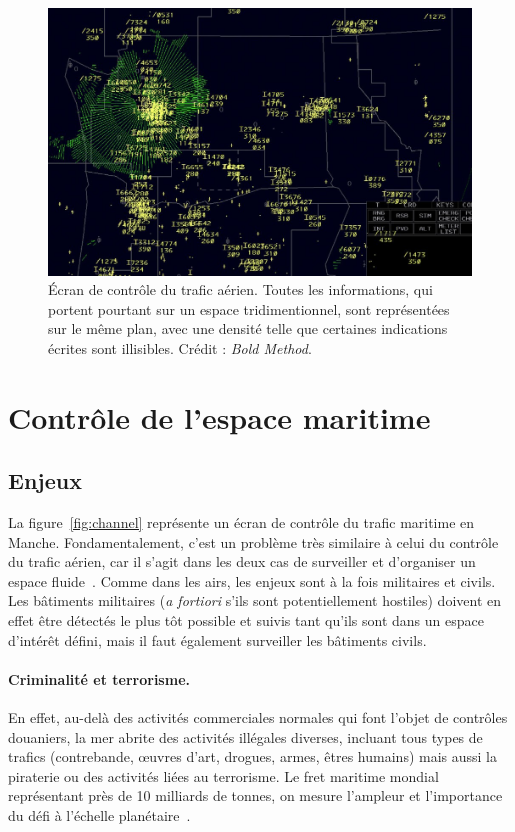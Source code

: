 	\begin{figure}[htb]
		\centering
		\includegraphics[width=\textwidth]{figures/ch1/Radar-Scope-ZSE}
		\caption[Écran de contrôle du trafic aérien, en 2D.]{Écran de contrôle du trafic aérien. Toutes les informations, qui portent pourtant sur un espace tridimentionnel, sont représentées sur le même plan, avec une densité telle que certaines indications écrites sont illisibles. Crédit : \emph{Bold Method}\footnotemark.}
		\label{fig:airtraffic}
	\end{figure}
	
	
	\section{Contrôle de l'espace maritime}
	\subsection{Enjeux}
	La figure~\ref{fig:channel} représente un écran de contrôle du trafic maritime en Manche. Fondamentalement, c'est un problème très similaire à celui du contrôle du trafic aérien, car il s'agit dans les deux cas de surveiller et d'organiser un espace fluide~\cite{henninger2012avant}. Comme dans les airs, les enjeux sont à la fois militaires et civils. Les bâtiments militaires (\emph{a fortiori} s'ils sont potentiellement hostiles) doivent en effet être détectés le plus tôt possible et suivis tant qu'ils sont dans un espace d'intérêt défini, mais il faut également surveiller les bâtiments civils.
	
	\paragraph{Criminalité et terrorisme.}
	En effet, au-delà des activités commerciales normales qui font l'objet de contrôles douaniers, la mer abrite des activités illégales diverses, incluant tous types de trafics (contrebande, œuvres d'art, drogues, armes, êtres humains) mais aussi la piraterie ou des activités liées au terrorisme.
	Le fret maritime mondial représentant près de 10 milliards de tonnes, on mesure l'ampleur et l'importance du défi à l'échelle planétaire~\cite{unctad}.
	
